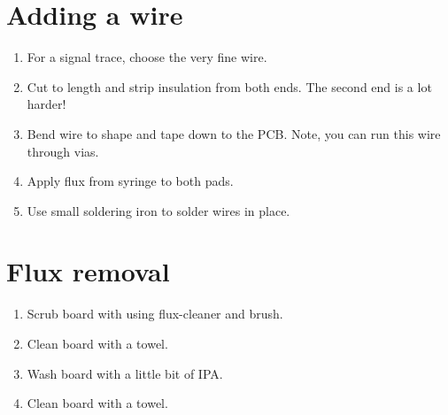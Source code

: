 \section{Adding a wire}

\begin{enumerate}
\item For a signal trace, choose the very fine wire.

\item Cut to length and strip insulation from both ends.  The second
  end is a lot harder!

\item Bend wire to shape and tape down to the PCB.  Note, you can run
  this wire through vias.

\item Apply flux from syringe to both pads.

\item Use small soldering iron to solder wires in place.
\end{enumerate}


\section{Flux removal}

\begin{enumerate}
\item Scrub board with using flux-cleaner and brush.
\item Clean board with a towel.
\item Wash board with a little bit of IPA.
\item Clean board with a towel.
\end{enumerate}




